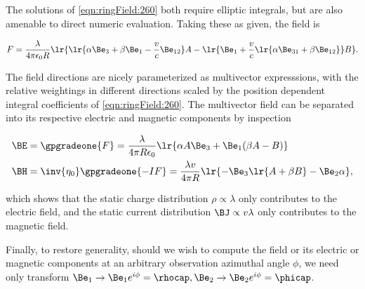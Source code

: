 The solutions of \cref{eqn:ringField:260} both require elliptic integrals, but are also amenable to direct numeric evaluation.  Taking these as given, the field is

\begin{dmath}\label{eqn:ringField:220}
F
=
\frac{\lambda}{4 \pi \epsilon_0 R}
\lr{
\lr{ \alpha \Be_3 + \beta \Be_1 -\frac{v }{c}\Be_{12} } A
- \lr{
\Be_1 + \frac{v}{c} \lr{ \alpha \Be_{31} + \beta \Be_{12} } } B
}.
\end{dmath}

The field directions are nicely parameterized as multivector expresssions, with the relative weightings in different directions scaled by the position dependent integral coefficients of \cref{eqn:ringField:260}.
The multivector field can be separated into its respective electric and magnetic components by inspection

\begin{dmath}\label{eqn:ringField:240}
\begin{aligned}
\BE &=
\gpgradeone{F}
=
\frac{\lambda}{4 \pi R \epsilon_0} \lr{ \alpha A \Be_3 + \Be_1( \beta A - B) } \\
\BH &=
\inv{\eta_0} \gpgradeone{-I F}
=
\frac{\lambda v}{4 \pi R } \lr{ -\Be_3 \lr{ A + \beta B } - \Be_2 \alpha },
\end{aligned}
\end{dmath}

which shows that the static charge distribution \( \rho \propto \lambda \) only contributes to the electric field, and the static current distribution \( \BJ \propto v \lambda \) only contributes to the magnetic field.

Finally, to restore generality,
should we wish to compute the field or its electric or magnetic components at an arbitrary observation azimuthal angle \( \phi \), we need only transform \( \Be_1 \rightarrow \Be_1 e^{i \phi} = \rhocap, \Be_2 \rightarrow \Be_2 e^{i\phi} = \phicap \).

